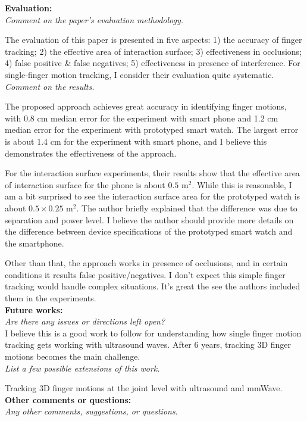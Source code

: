 \documentclass[11pt, oneside]{article}   	%
\begin{document}
\noindent \textbf{Evaluation:}\\
\emph{Comment on the paper's evaluation methodology.}

The evaluation of this paper is presented in five aspects: 1) the accuracy of finger tracking; 2) the effective area of interaction surface; 3) effectiveness in occlusions; 4) false positive \& false negatives; 5) effectiveness in presence of interference.  For single-finger motion tracking, I consider their evaluation quite systematic.\\

\noindent \emph{Comment on the results.}

The proposed approach achieves great accuracy in identifying finger motions, with 0.8 cm median error for the experiment with smart phone and 1.2 cm median error for the experiment with prototyped smart watch. The largest error is about 1.4 cm for the experiment with smart phone, and I believe this demonstrates the effectiveness of the approach.

For the interaction surface experiments, their results show that the effective area of interaction surface for the phone is about $0.5$ m$^2$. While this is reasonable, I am a bit surprised to see the interaction surface area for the  prototyped watch is about $0.5 \times 0.25$ m$^2$. The author briefly explained that the difference was due to separation and power level. I believe the author should provide more details on the difference between device specifications of the prototyped smart watch and the smartphone. 

Other than that, the approach works in presence of occlusions, and in certain conditions it results false positive/negatives. I don't expect this simple finger tracking would handle complex situations. It's great the see the authors included them in the experiments.\\

\noindent \textbf{Future works:}\\
\emph{Are there any issues or directions left open?}\\

I believe this is a good work to follow for understanding how single finger motion tracking gets working with ultrasound waves. After 6 years, tracking 3D finger motions becomes the main challenge.\\

\noindent \emph{List a few possible extensions of this work.}

Tracking 3D finger motions at the joint level with ultrasound and mmWave.\\
\noindent \textbf{Other comments or questions:}\\
\emph{Any other comments, suggestions, or questions}.
\end{document}
